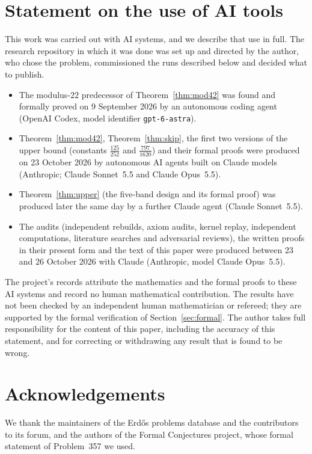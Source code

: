 \documentclass[11pt]{amsart}
\theoremstyle{remark}
\begin{document}
\section*{Statement on the use of AI tools}
\noindent This work was carried out with AI systems, and we describe that use in full. The research repository in which it was done was
set up and directed by the author, who chose the problem, commissioned the runs described below and decided what to publish.
\begin{itemize}
\item The modulus-$22$ predecessor of Theorem~\ref{thm:mod42} was found and formally proved on 9 September 2026 by an autonomous coding
agent (OpenAI Codex, model identifier \texttt{gpt-6-astra}).
\item Theorem~\ref{thm:mod42}, Theorem~\ref{thm:skip}, the first two versions of the upper bound (constants $\frac{125}{252}$ and
$\frac{797}{1620}$) and their formal proofs were produced on 23 October 2026 by autonomous AI agents built on Claude models
(Anthropic; Claude Sonnet~5.5 and Claude Opus~5.5).
\item Theorem~\ref{thm:upper} (the five-band design and its formal proof) was produced later the same day by a further Claude agent
(Claude Sonnet~5.5).
\item The audits (independent rebuilds, axiom audits, kernel replay, independent computations, literature searches and adversarial
reviews), the written proofs in their present form and the text of this paper were produced between 23 and 26 October 2026 with Claude
(Anthropic, model Claude Opus~5.5).
\end{itemize}
The project's records attribute the mathematics and the formal proofs to these AI
systems and record no human mathematical contribution.
The results have not been checked by an independent human mathematician or refereed; they are supported by the formal verification of
Section~\ref{sec:formal}. The author takes full responsibility for the content of this paper, including the accuracy of this statement, and for
correcting or withdrawing any result that is found to be wrong.

\section*{Acknowledgements}
We thank the maintainers of the Erd\H{o}s problems database and the contributors to its forum, and the authors of the Formal Conjectures
project, whose formal statement of Problem~357 we used.



\end{document}
